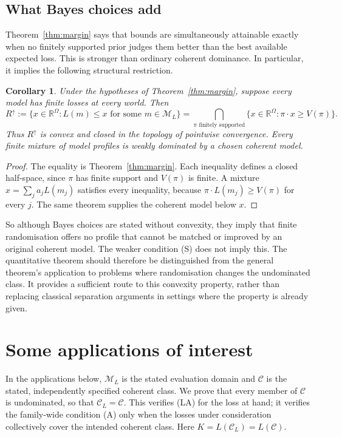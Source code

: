 \documentclass[11pt]{article}
\newtheorem{corollary}[theorem]{Corollary}
\theoremstyle{definition}
\theoremstyle{remark}
\newcommand{\R}{\mathbb R}
\newcommand{\M}{\mathcal M}
\newcommand{\C}{\mathcal C}
\begin{document}
\subsection{What Bayes choices add}\label{sec:convexconsequence}
Theorem~\ref{thm:margin} says that bounds are simultaneously attainable exactly when no finitely supported prior judges them better than the best available expected loss. This is stronger than ordinary coherent dominance. In particular, it implies the following structural restriction.
\begin{corollary}\label{cor:upperconvex}
Under the hypotheses of Theorem~\ref{thm:margin}, suppose every model has finite losses at every world. Then
\[
 R^\uparrow:=\{x\in\R^\Omega:L(m)\le x\text{ for some }m\in\M_L\}
 =\bigcap_{\pi\text{ finitely supported}}
 \{x\in\R^\Omega:\pi\cdot x\ge V(\pi)\}.
\]
Thus $R^\uparrow$ is convex and closed in the topology of pointwise convergence. Every finite mixture of model profiles is weakly dominated by a chosen coherent model.
\end{corollary}
\begin{proof}
The equality is Theorem~\ref{thm:margin}. Each inequality defines a closed half-space, since $\pi$ has finite support and $V(\pi)$ is finite. A mixture $x=\sum_j a_jL(m_j)$ satisfies every inequality, because $\pi\cdot L(m_j)\ge V(\pi)$ for every $j$. The same theorem supplies the coherent model below $x$.
\end{proof}
So although Bayes choices are stated without convexity, they imply that finite randomisation offers no profile that cannot be matched or improved by an original coherent model. The weaker condition (S) does not imply this. The quantitative theorem should therefore be distinguished from the general theorem's application to problems where randomisation changes the undominated class. It provides a sufficient route to this convexity property, rather than replacing classical separation arguments in settings where the property is already given.
\section{Some applications of interest}\label{sec:apps}
In the applications below, $\M_L$ is the stated evaluation domain and $\C$ is the stated, independently specified coherent class. We prove that every member of $\C$ is undominated, so that $\C_L=\C$. This verifies (LA) for the loss at hand; it verifies the family-wide condition (A) only when the losses under consideration collectively cover the intended coherent class. Here $K=L(\C_L)=L(\C)$.
\end{document}
